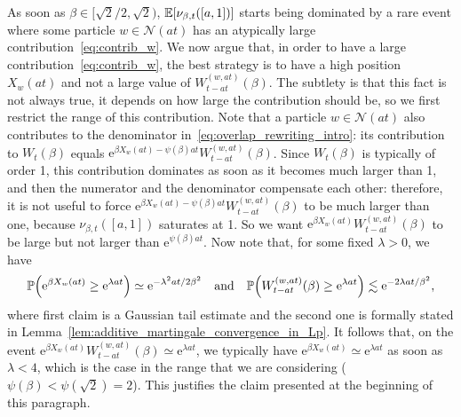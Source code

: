\documentclass[AHL,Unicode,longabstracts,published]{cedram}
\newcommand{\e}{\mathrm{e}}
\renewcommand{\P}{\mathbb{P}}
\newcommand\1{\mathds{1}}
\newcommand{\cN}{\mathcal{N}}
\newcommand{\Expec}[1]{\mathbb{E}\left[#1\right]}
\let\originalleft\left
\let\originalright\right
\renewcommand{\left}{\mathopen{}\mathclose\bgroup\originalleft}
\renewcommand{\right}{\aftergroup\egroup\originalright}
\begin{document}
As soon as $\beta \in [\sqrt{2}/2,\sqrt{2})$, $\Expec{\nu_{\beta, t}([a, 1])}$ starts being dominated by a rare event where some particle $w\in\cN(at)$ has an atypically large contribution~\eqref{eq:contrib_w}. We now argue that, in order to have a large contribution~\eqref{eq:contrib_w}, the best strategy is to have a high position $X_w(at)$ and not a large value of $W_{t-at}^{(w,at)}(\beta)$. The subtlety is that this fact is not always true, it depends on how large the contribution should be, so we first restrict the range of this contribution. Note that a particle $w \in \cN(at)$ also contributes to the denominator in~\eqref{eq:overlap_rewriting_intro}: its contribution to $W_t(\beta)$ equals $\e^{\beta X_w(at) - \psi(\beta)at} W_{t - at}^{(w, at)}(\beta)$. Since $W_t(\beta)$ is typically of order 1, this contribution dominates as soon as it becomes much larger than 1, and then the numerator and the denominator compensate each other: therefore, it is not useful to force $\e^{\beta X_w(at) - \psi(\beta)at} W_{t - at}^{(w, at)}(\beta)$ to be much larger than one, because $\nu_{\beta, t}([a, 1])$ saturates at 1. So we want $\e^{\beta X_w(at)} W_{t-at}^{(w, at)}(\beta)$ to be large but not larger than $\e^{\psi(\beta)at}$. Now note that, for some fixed $\lambda > 0$, we have
\begin{equation*}
\P \left(\e^{\beta X_w(at)} \geq \e^{\lambda at} \right)
\simeq \e^{-\lambda^2 at/2\beta^2}
\quad \text{and}\quad
\P \left(W_{t - at}^{(w, at)}(\beta) \geq \e^{\lambda at} \right) \lesssim \e^{-2\lambda at/\beta^2},
\end{equation*}
where first claim is a Gaussian tail estimate and the second one is formally stated in Lemma~\ref{lem:additive_martingale_convergence_in_Lp}. It follows that, on the event $\e^{\beta X_w(at)} W_{t-at}^{(w, at)}(\beta) \simeq \e^{\lambda at}$, we typically have $\e^{\beta X_w(at)} \simeq \e^{\lambda at}$ as soon as $\lambda<4$, which is the case in the range that we are considering ($\psi(\beta) < \psi(\sqrt{2}) = 2$). This justifies the claim presented at the beginning of this paragraph.
\end{document}
